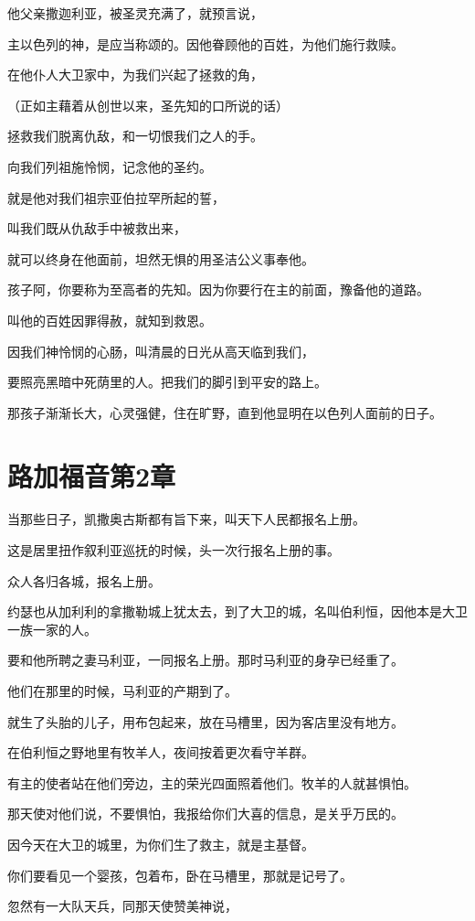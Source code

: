 \documentclass[12pt,oneside]{book}
\begin{document}
他父亲撒迦利亚，被圣灵充满了，就预言说，

主以色列的神，是应当称颂的。因他眷顾他的百姓，为他们施行救赎。

在他仆人大卫家中，为我们兴起了拯救的角，

（正如主藉着从创世以来，圣先知的口所说的话）

拯救我们脱离仇敌，和一切恨我们之人的手。

向我们列祖施怜悯，记念他的圣约。

就是他对我们祖宗亚伯拉罕所起的誓，

叫我们既从仇敌手中被救出来，

就可以终身在他面前，坦然无惧的用圣洁公义事奉他。

孩子阿，你要称为至高者的先知。因为你要行在主的前面，豫备他的道路。

叫他的百姓因罪得赦，就知到救恩。

因我们神怜悯的心肠，叫清晨的日光从高天临到我们，

要照亮黑暗中死荫里的人。把我们的脚引到平安的路上。

那孩子渐渐长大，心灵强健，住在旷野，直到他显明在以色列人面前的日子。

\chapter{路加福音第2章}
当那些日子，凯撒奥古斯都有旨下来，叫天下人民都报名上册。

这是居里扭作叙利亚巡抚的时候，头一次行报名上册的事。

众人各归各城，报名上册。

约瑟也从加利利的拿撒勒城上犹太去，到了大卫的城，名叫伯利恒，因他本是大卫一族一家的人。

要和他所聘之妻马利亚，一同报名上册。那时马利亚的身孕已经重了。

他们在那里的时候，马利亚的产期到了。

就生了头胎的儿子，用布包起来，放在马槽里，因为客店里没有地方。

在伯利恒之野地里有牧羊人，夜间按着更次看守羊群。

有主的使者站在他们旁边，主的荣光四面照着他们。牧羊的人就甚惧怕。

那天使对他们说，不要惧怕，我报给你们大喜的信息，是关乎万民的。

因今天在大卫的城里，为你们生了救主，就是主基督。

你们要看见一个婴孩，包着布，卧在马槽里，那就是记号了。

忽然有一大队天兵，同那天使赞美神说，
\end{document}
